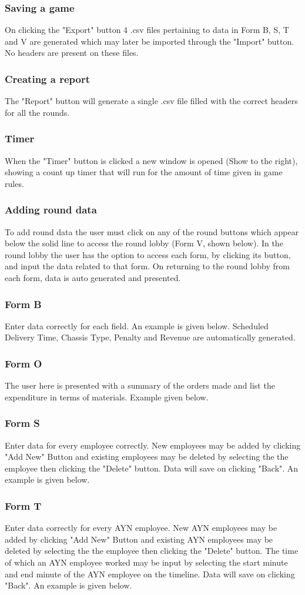 \documentclass{l3proj}
\begin{document}
\subsubsection{Saving a game}
On clicking the "Export" button 4 .csv files pertaining to data in Form B, S, T and V are generated which may later be imported through the "Import" button. No headers are present on these files.
\subsubsection{Creating a report}
The "Report" button will generate a single .csv file filled with the correct headers for all the rounds.
\subsubsection{Timer}
When the "Timer" button is clicked a new window is opened (Show to the right), showing a count up timer that will run for the amount of time given in game rules.
\subsubsection{Adding round data}
To add round data the user must click on any of the round buttons which appear below the solid line to access the round lobby (Form V, shown below).
In the round lobby the user has the option to access each form, by clicking its button, and input the data related to that form. On returning to the round lobby from each form, data is auto generated and presented.
\subsubsection{Form B}
Enter data correctly for each field. An example is given below. Scheduled Delivery Time, Chassis Type, Penalty and Revenue are automatically generated.
\subsubsection{Form O}
The user here is presented with a summary of the orders made and list the expenditure in terms of materials. Example given below.
\subsubsection{Form S}
Enter data for every employee correctly. New employees may be added by clicking "Add New" Button and existing employees may be deleted by selecting the the employee then clicking the "Delete" button. Data will save on clicking "Back". An example is given below.
\subsubsection{Form T}
Enter data correctly for every AYN employee. New AYN employees may be added by clicking "Add New" Button and existing AYN employees may be deleted by selecting the the employee then clicking the "Delete" button. The time of which an AYN employee worked may be input by selecting the start minute and end minute of the AYN employee on the timeline. Data will save on clicking "Back". An example is given below.



\end{document}
